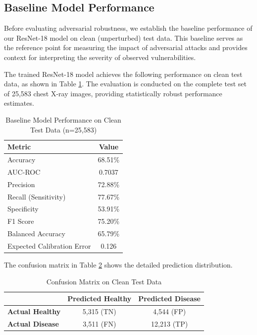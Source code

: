 \documentclass[12pt,a4paper]{article}
\begin{document}
\subsection{Baseline Model Performance}

Before evaluating adversarial robustness, we establish the baseline performance of our ResNet-18 model on clean (unperturbed) test data. This baseline serves as the reference point for measuring the impact of adversarial attacks and provides context for interpreting the severity of observed vulnerabilities.

The trained ResNet-18 model achieves the following performance on clean test data, as shown in Table \ref{tab:baseline}. The evaluation is conducted on the complete test set of 25,583 chest X-ray images, providing statistically robust performance estimates.

\begin{table}[H]
\centering
\caption{Baseline Model Performance on Clean Test Data (n=25,583)}
    \label{tab:baseline}
\begin{tabular}{lc}
\toprule
\textbf{Metric} & \textbf{Value} \\
\midrule
        Accuracy & 68.51\% \\
AUC-ROC & 0.7037 \\
Precision & 72.88\% \\
Recall (Sensitivity) & 77.67\% \\
Specificity & 53.91\% \\
        F1 Score & 75.20\% \\
Balanced Accuracy & 65.79\% \\
        Expected Calibration Error & 0.126 \\
\bottomrule
\end{tabular}
\end{table}

The confusion matrix in Table \ref{tab:confusion_baseline} shows the detailed prediction distribution.

\begin{table}[H]
\centering
    \caption{Confusion Matrix on Clean Test Data}
    \label{tab:confusion_baseline}
    \begin{tabular}{lcc}
        \toprule
        & \textbf{Predicted Healthy} & \textbf{Predicted Disease} \\
        \midrule
        \textbf{Actual Healthy} & 5,315 (TN) & 4,544 (FP) \\
        \textbf{Actual Disease} & 3,511 (FN) & 12,213 (TP) \\
        \bottomrule
    \end{tabular}
\end{table} 
\end{document}
